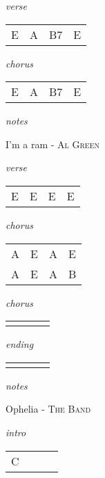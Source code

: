 \documentclass[12pt]{article}
\begin{document}
\huge
\textit{verse}

\begin{tabular}{|P{1.25in}|P{1.25in}|P{1.25in}|P{1.25in}|}
  E  &  A & B7  & E  \\
\end{tabular}

\textit{chorus}

\begin{tabular}{|P{1.25in}|P{1.25in}|P{1.25in}|P{1.25in}|}
   E &  A &  B7 & E  \\
\end{tabular}

\textit{notes}

\newpage

{\Huge I'm a ram} {\huge - \textsc{Al Green}}

\huge
\textit{verse}

\begin{tabular}{|P{1.25in}|P{1.25in}|P{1.25in}|P{1.25in}|}
  E  & E  & E  &  E \\
\end{tabular}

\textit{chorus}

\begin{tabular}{|P{1.25in}|P{1.25in}|P{1.25in}|P{1.25in}|}
    A  &  E &  A &  E \\
    A  &  E &  A &  B \\
\end{tabular}

\textit{chorus}

\begin{tabular}{|P{1.25in}|P{1.25in}|P{1.25in}|P{1.25in}|}
    &   &   &   \\
\end{tabular}

\textit{ending}

\begin{tabular}{|P{1.25in}|P{1.25in}|P{1.25in}|P{1.25in}|}
    &   &   &   \\
\end{tabular}

\textit{notes}

\newpage


{\Huge Ophelia} {\huge - \textsc{The Band}}

\huge
\textit{intro}

\begin{tabular}{|P{1.25in}|P{1.25in}|P{1.25in}|P{1.25in}|}
  C &   &   &   \\
\end{tabular}
\end{document}
